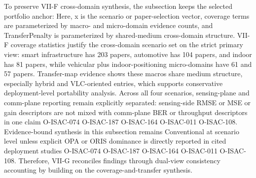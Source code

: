 {}
\markdownRendererSectionEnd \markdownRendererSectionBegin
{}\markdownRendererInterblockSeparator
{}To preserve VII-F cross-domain synthesis, the subsection keeps the selected portfolio anchor:\markdownRendererParagraphSeparator
{}\markdownRendererSoftLineBreak
{}\markdownRendererSoftLineBreak
{}\markdownRendererParagraphSeparator
{}Here, x is the scenario or paper-selection vector, coverage terms are parameterized by macro- and micro-domain evidence counts, and TransferPenalty is parameterized by shared-medium cross-domain structure.\markdownRendererParagraphSeparator
{}\markdownRendererInterblockSeparator
{}\markdownRendererUlBeginTight
\markdownRendererUlItem VII-F coverage statistics justify the cross-domain scenario set on the strict primary view: smart infrastructure has 203 papers, automotive has 104 papers, and indoor has 81 papers, while vehicular plus indoor-positioning micro-domains have 61 and 57 papers.\markdownRendererUlItemEnd 
\markdownRendererUlItem Transfer-map evidence shows these macros share medium structure, especially hybrid and VLC-oriented entries, which supports conservative deployment-level portability analysis.\markdownRendererUlItemEnd 
\markdownRendererUlItem Across all four scenarios, sensing-plane and comm-plane reporting remain explicitly separated: sensing-side RMSE or MSE or gain descriptors are not mixed with comm-plane BER or throughput descriptors in one claim O-ISAC-074 O-ISAC-187 O-ISAC-164 O-ISAC-011 O-ISAC-108.\markdownRendererUlItemEnd 
\markdownRendererUlItem Evidence-bound synthesis in this subsection remains Conventional at scenario level unless explicit OPA or ORIS dominance is directly reported in cited deployment studies O-ISAC-074 O-ISAC-187 O-ISAC-164 O-ISAC-011 O-ISAC-108.\markdownRendererUlItemEnd 
\markdownRendererUlEndTight \markdownRendererInterblockSeparator
{}Therefore, VII-G reconciles findings through dual-view consistency accounting by building on the coverage-and-transfer synthesis.\markdownRendererInterblockSeparator
{}
\markdownRendererSectionEnd 
\markdownRendererSectionEnd \markdownRendererSectionBegin
